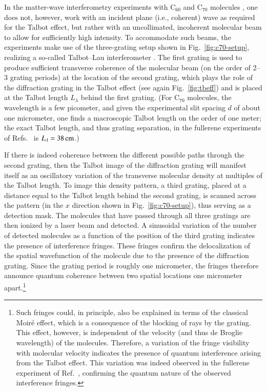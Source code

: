 \documentclass[3p,sort&compress]{elsarticle}
\begin{document}
In the matter-wave interferometry experiments with C$_{60}$ and C$_{70}$  molecules \cite{Brezger:2002:mu,Hornberger:2003:tv,Hackermueller:2002:wb,Hackermuller:2003:uu,Hackermuller:2004:rd}, one does not, however, work with an incident plane (i.e., coherent) wave as required for the Talbot effect, but rather with an uncollimated, incoherent molecular beam to allow for sufficiently high intensity. To accommodate such beams, the experiments make use of the three-grating setup shown in Fig.~\ref{fig:c70-setup}, realizing a so-called  Talbot--Lau interferometer \cite{Brezger:2002:mu,Hornberger:2003:tv,Hackermuller:2003:uu,Hackermueller:2002:wb,Hackermuller:2004:rd}. The first grating is used to produce sufficient transverse coherence of the molecular beam (on the order of 2--3 grating periods) at the location of the second grating, which plays the role of the diffraction grating in the Talbot effect (see again Fig.~\ref{fig:tbeff}) and is placed at the Talbot length $L_\lambda$ behind the first grating. (For C$_{70}$ molecules, the wavelength is a few picometer, and given the experimental slit spacing $d$ of about one micrometer, one finds a macroscopic Talbot length on the order of one meter; the exact Talbot length, and thus grating separation, in the fullerene experiments of Refs.~\cite{Brezger:2002:mu,Hornberger:2003:tv,Hackermueller:2002:wb,Hackermuller:2003:uu,Hackermuller:2004:rd} is $L_\lambda = \unit[38]{cm}$.) 

If there is indeed coherence between the different possible paths through the second grating, then the Talbot image of the diffraction grating will manifest itself as an oscillatory variation of the transverse molecular density at multiples of the Talbot length. To image this density pattern, a third grating, placed at a distance equal to the Talbot length behind the second grating, is scanned across the pattern (in the $x$ direction shown in Fig.~\ref{fig:c70-setup}), thus serving as a detection mask. The molecules that have passed through all three gratings are then ionized by a laser beam and detected. A sinusoidal variation of the number of detected molecules as a function of the position of the third grating indicates the presence of interference fringes. These fringes confirm the delocalization of the spatial wavefunction of the molecule due to the presence of the diffraction grating. Since the grating period is roughly one micrometer, the fringes therefore announce quantum coherence between two spatial locations one micrometer apart.\footnote{Such fringes could, in principle, also be explained in terms of the classical Moir\'e effect, which is a consequence of the blocking of rays by the grating. This effect, however, is independent of the velocity (and thus de Broglie wavelength) of the molecules. Therefore, a variation of the fringe visibility with molecular velocity indicates the presence of quantum interference arising from the Talbot effect. This variation was indeed observed in the fullerene experiment of Ref.~\cite{Brezger:2002:mu}, confirming the quantum nature of the observed interference fringes.}  
\end{document}
